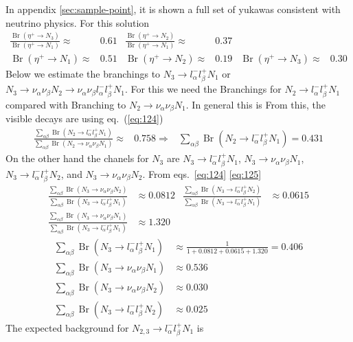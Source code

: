In appendix \ref{sec:sample-point}, it is shown a full set of yukawas consistent with neutrino physics. For this solution 
\begin{align}
  \frac{\operatorname{Br}(\eta^+\to N_3)}{\operatorname{Br}(\eta^+\to N_1)}\approx&0.61&
  \frac{\operatorname{Br}(\eta^+\to N_2)}{\operatorname{Br}(\eta^+\to N_1)}\approx&0.37&\nonumber\\
  {\operatorname{Br}(\eta^+\to N_1)}\approx&0.51&  {\operatorname{Br}(\eta^+\to N_2)}\approx&0.19 & {\operatorname{Br}(\eta^+\to N_3)}\approx&0.30
\end{align}
Below we estimate the branchings to $N_3\to l_\alpha^-l_\beta^+ N_1$ or $N_3\to\nu_\alpha\nu_\beta N_2\to\nu_\alpha\nu_\beta l_\alpha^-l_\beta^+ N_1$. For this we need the Branchings
for $N_2\to l_\alpha^-l_\beta^+ N_1$ compared with Branching to $N_2\to\nu_\alpha\nu_\beta N_1$. In general this is
From this, the visible decays are using eq.~(\ref{eq:124}) 
\begin{align}
   \frac{\sum_{\alpha\beta}\operatorname{Br}(N_2\to l_\alpha^- l_\beta^+ N_1)}{\sum_{\alpha\beta}\operatorname{Br}(N_2\to \nu_\alpha \nu_\beta N_1)}\approx&0.758
   \Rightarrow&\sum_{\alpha\beta} \operatorname{Br}(N_2\to l_\alpha^- l_\beta^+ N_1)=0.431
\end{align}
On the other hand the chanels for $N_3$ are $N_3\to l_\alpha^-l_\beta^+ N_1$, $N_3\to\nu_\alpha\nu_\beta N_1$, $N_3\to l_\alpha^-l_\beta^+ N_2$, and $N_3\to\nu_\alpha\nu_\beta N_2$.
From eqs.~\eqref{eq:124} \eqref{eq:125}
\begin{align}
  \frac{\sum_{\alpha\beta}\operatorname{Br}(N_3\to\nu_\alpha\nu_\beta N_2)}{\sum_{\alpha\beta}\operatorname{Br}(N_3\to l_\alpha^-l_\beta^+ N_1)}
  &\approx0.0812& 
  \frac{\sum_{\alpha\beta}\operatorname{Br}(N_3\to l_\alpha^-l_\beta^+ N_2)}{\sum_{\alpha\beta}\operatorname{Br}(N_3\to l_\alpha^-l_\beta^+ N_1)}
  &\approx0.0615\nonumber\\
\frac{\sum_{\alpha\beta}\operatorname{Br}(N_3\to\nu_\alpha\nu_\beta N_1)}{\sum_{\alpha\beta}\operatorname{Br}(N_3\to l_\alpha^-l_\beta^+ N_1)}
  &\approx1.320
\end{align}
\begin{align}
  \sum_{\alpha\beta}\operatorname{Br}(N_3\to l_\alpha^-l_\beta^+ N_1)&\approx\frac{1}{1+0.0812+0.0615+1.320}=0.406\nonumber\\ 
  \sum_{\alpha\beta}\operatorname{Br}(N_3\to\nu_\alpha\nu_\beta N_1)&\approx0.536\nonumber\\
  \sum_{\alpha\beta}\operatorname{Br}(N_3\to\nu_\alpha\nu_\beta N_2)&\approx0.030\nonumber\\
  \sum_{\alpha\beta}\operatorname{Br}(N_3\to l_\alpha^-l_\beta^+ N_2)&\approx0.025
\end{align}
The expected background for $N_{2,3}\to l_\alpha^-l_\beta^+ N_1$ is 

